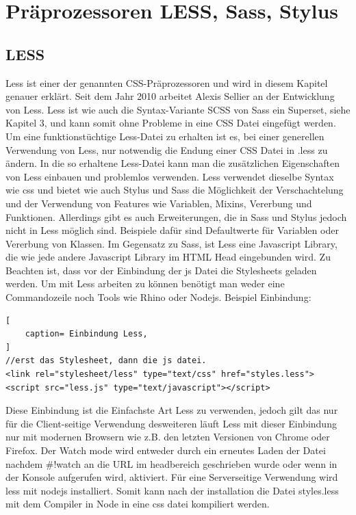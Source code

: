 \section{Präprozessoren LESS, Sass, Stylus}
\subsection{LESS}
Less ist einer der genannten CSS-Präprozessoren und wird in diesem Kapitel genauer erklärt.\newline
Seit dem Jahr 2010 arbeitet Alexis Sellier an der Entwicklung von Less.\newline
Less ist wie auch die Syntax-Variante SCSS von Sass ein Superset, siehe Kapitel 3, und kann somit ohne Probleme in eine CSS Datei eingefügt werden. Um eine funktionstüchtige Less-Datei zu erhalten ist es, bei einer generellen Verwendung von Less, nur notwendig die Endung einer CSS Datei in .less zu ändern. In die so erhaltene Less-Datei kann man die zusätzlichen Eigenschaften von Less einbauen und problemlos verwenden. \newline
Less verwendet dieselbe Syntax wie css und bietet wie auch Stylus und Sass die Möglichkeit der Verschachtelung und der Verwendung von Features wie Variablen, Mixins, Vererbung und Funktionen.\newline
Allerdings gibt es auch Erweiterungen, die in Sass und Stylus jedoch nicht in Less möglich sind. Beispiele dafür sind Defaultwerte für Variablen oder Vererbung von Klassen.\newline
Im Gegensatz zu Sass, ist Less eine Javascript Library, die wie jede andere Javascript Library im HTML Head eingebunden wird. Zu Beachten ist, dass vor der Einbindung der js Datei die Stylesheets geladen werden. \newline
Um mit Less arbeiten zu können benötigt man weder eine Commandozeile noch Tools wie Rhino oder Nodejs.
Beispiel Einbindung:
\begin{lstlisting}[
	caption= Einbindung Less,
]
//erst das Stylesheet, dann die js datei.
<link rel="stylesheet/less" type="text/css" href="styles.less">
<script src="less.js" type="text/javascript"></script>    
\end{lstlisting}
Diese Einbindung ist die Einfachste Art Less zu verwenden, jedoch gilt das nur für die Client-seitige Verwendung desweiteren läuft Less mit dieser Einbindung nur mit modernen Browsern wie z.B. den letzten Versionen von Chrome oder Firefox.\newline
Der Watch mode wird entweder durch ein erneutes Laden der Datei nachdem \glqq\#!watch\grqq{} an die URL im headbereich geschrieben wurde oder wenn in der Konsole \grqq{}   aufgerufen wird, aktiviert.\newline
Für eine Serverseitige Verwendung wird less mit nodejs installiert. Somit kann nach der installation die Datei styles.less mit dem Compiler in Node in eine css datei kompiliert werden.\autocite[]{Sellier.2013}

